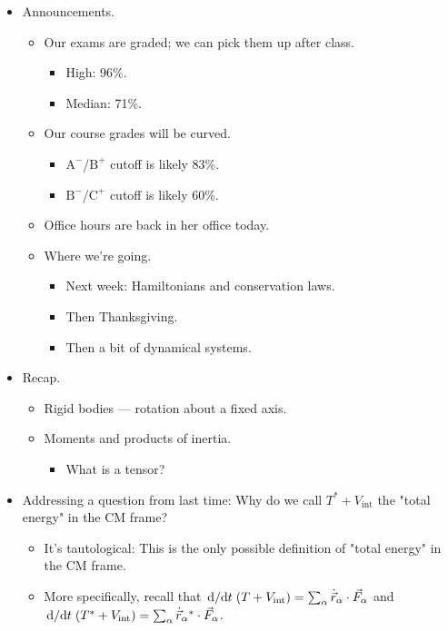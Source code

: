 \documentclass[../notes.tex]{subfiles}
\begin{document}
\begin{itemize}
    \item {}Announcements.
    \begin{itemize}
        \item Our exams are graded; we can pick them up after class.
        \begin{itemize}
            \item High: 96\%.
            \item Median: 71\%.
        \end{itemize}
        \item Our course grades will be curved.
        \begin{itemize}
            \item $\text{A}^-$/$\text{B}^+$ cutoff is likely 83\%.
            \item $\text{B}^-$/$\text{C}^+$ cutoff is likely 60\%.
        \end{itemize}
        \item Office hours are back in her office today.
        \item Where we're going.
        \begin{itemize}
            \item Next week: Hamiltonians and conservation laws.
            \item Then Thanksgiving.
            \item Then a bit of dynamical systems.
        \end{itemize}
    \end{itemize}
    \item Recap.
    \begin{itemize}
        \item Rigid bodies --- rotation about a fixed axis.
        \item Moments and products of inertia.
        \begin{itemize}
            \item What is a tensor?
        \end{itemize}
    \end{itemize}
    \item Addressing a question from last time: Why do we call $T^*+V_\text{int}$ the "total energy" in the CM frame?
    \begin{itemize}
        \item It's tautological: This is the only possible definition of "total energy" in the CM frame.
        \item More specifically, recall that $\dv*{t}(T+V_\text{int})=\sum_\alpha\dot{\vec{r}}_\alpha\cdot\vec{F}_\alpha$ and $\dv*{t}(T^*+V_\text{int})=\sum_\alpha\dot{\vec{r}}_\alpha{}^*\cdot\vec{F}_\alpha$.

\end{itemize}
\end{itemize}
\end{document}

